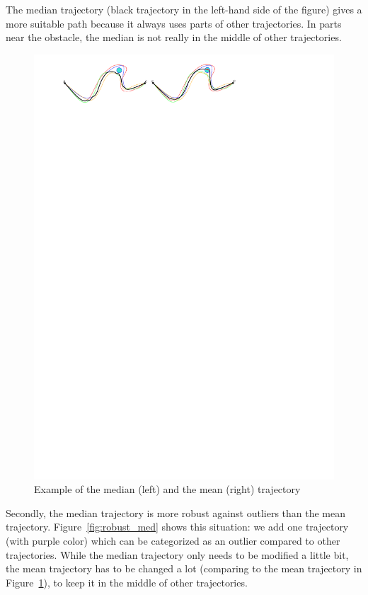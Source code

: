 The median trajectory (black trajectory in the left-hand side of the figure) gives a more suitable path because it always uses parts of other trajectories.
In parts near the obstacle, the median is not really in the middle of other trajectories.

\begin{figure}
\centering
\includegraphics[scale=1]{Gambar/mean_dis}
\caption[Example of the median (left) and the mean (right) trajectory \cite{Lionov:2009}]{Example of the median (left) and the mean (right) trajectory \cite{Lionov:2009}} 
\label{fig:mean_dis}
\end{figure}

Secondly, the median trajectory is more robust against outliers than the mean trajectory.
Figure~\ref{fig:robust_med} shows this situation: we add one trajectory (with purple color) which can be categorized as an outlier compared to other trajectories. 
While the median trajectory only needs to be modified a little bit, the mean trajectory has to be changed a lot (comparing to the mean trajectory in Figure~\ref{fig:mean_dis}), to keep it in the middle of other trajectories.


